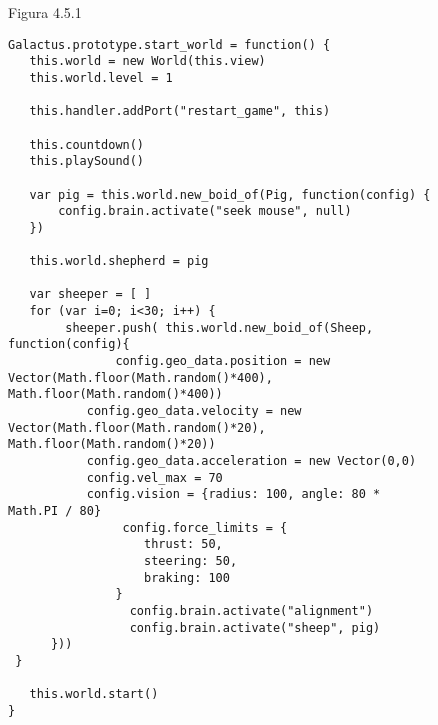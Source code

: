 \begin{figure}[p]
Figura 4.5.1
\begin{verbatim}
Galactus.prototype.start_world = function() {
   this.world = new World(this.view)
   this.world.level = 1

   this.handler.addPort("restart_game", this)
   
   this.countdown()
   this.playSound()

   var pig = this.world.new_boid_of(Pig, function(config) {
       config.brain.activate("seek mouse", null)
   })

   this.world.shepherd = pig

   var sheeper = [ ]
   for (var i=0; i<30; i++) {
        sheeper.push( this.world.new_boid_of(Sheep, function(config){
               config.geo_data.position = new Vector(Math.floor(Math.random()*400), Math.floor(Math.random()*400))
           config.geo_data.velocity = new Vector(Math.floor(Math.random()*20), Math.floor(Math.random()*20))
           config.geo_data.acceleration = new Vector(0,0)
           config.vel_max = 70
           config.vision = {radius: 100, angle: 80 * Math.PI / 80}           
                config.force_limits = {
                   thrust: 50,
                   steering: 50,
                   braking: 100
               }
                 config.brain.activate("alignment")
                 config.brain.activate("sheep", pig)
      }))
 }

   this.world.start()
}
\end{verbatim}
\end{figure}
